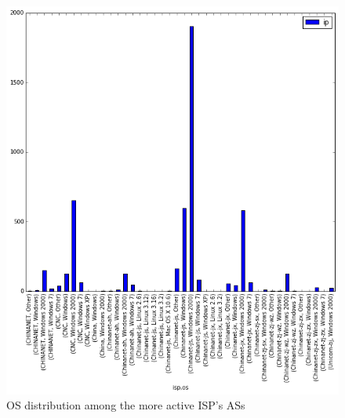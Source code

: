 \begin{figure}[h]
     \caption{OS distribution among the more active ISP's ASs}
     \label{fig:os_distribution}
    \centering
    \includegraphics[width=\linewidth]{images/os_isp}
\end{figure}

